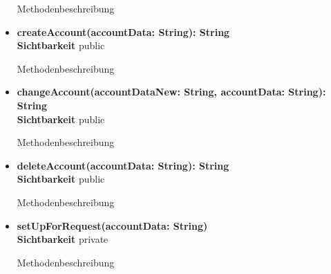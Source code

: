 \begin{itemize}
Methodenbeschreibung

\item \textbf{createAccount(accountData: String): String}\hfill\\
\textbf{Sichtbarkeit} public

Methodenbeschreibung

\item \textbf{changeAccount(accountDataNew: String, accountData: String): String}\hfill\\
\textbf{Sichtbarkeit} public

Methodenbeschreibung

\item \textbf{deleteAccount(accountData: String): String}\hfill\\
\textbf{Sichtbarkeit} public

Methodenbeschreibung

\item \textbf{setUpForRequest(accountData: String)}\hfill\\
\textbf{Sichtbarkeit} private

Methodenbeschreibung

\end{itemize}
